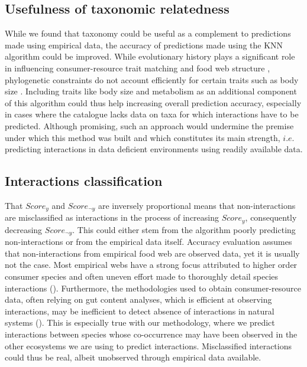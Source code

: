 \documentclass[letterpaper]{article}
\begin{document}
\subsection{Usefulness of taxonomic relatedness}
 While we found that taxonomy could be useful as a complement to predictions made using empirical data, the accuracy of predictions made using the KNN algorithm could be improved. While evolutionary history plays a significant role in influencing consumer-resource trait matching and food web structure \citep{Mouquet2012, Rohr2014}, phylogenetic constraints do not account efficiently for certain traits such as body size \citep{Eklof2016}. Including traits like body size and metabolism as an additional component of this algorithm could thus help increasing overall prediction accuracy, especially in cases where the catalogue lacks data on taxa for which interactions have to be predicted. Although promising, such an approach would undermine the premise under which this method was built and which constitutes its main strength, $i.e.$ predicting interactions in data deficient environments using readily available data.

\subsection{Interactions classification}
That $Score_{y}$ and $Score_{\neg y}$ are inversely proportional means that non-interactions are misclassified as interactions in the process of increasing $Score_y$, consequently decreasing $Score_{\neg y}$. This could either stem from the algorithm poorly predicting non-interactions or from the empirical data itself. Accuracy evaluation assumes that non-interactions from empirical food web are observed data, yet it is usually not the case. Most empirical webs have a strong focus attributed to higher order consumer species and often uneven effort made to thoroughly detail species interactions (\cite{Dunne2006}). Furthermore, the methodologies used to obtain consumer-resource data, often relying on gut content analyses, which is efficient at observing interactions, may be inefficient to detect absence of interactions in natural systems (\cite{Dunne2006}). This is especially true with our methodology, where we predict interactions between species whose co-occurrence may have been observed in the other ecosystems we are using to predict interactions. Misclassified interactions could thus be real, albeit unobserved through empirical data available.
\end{document}
